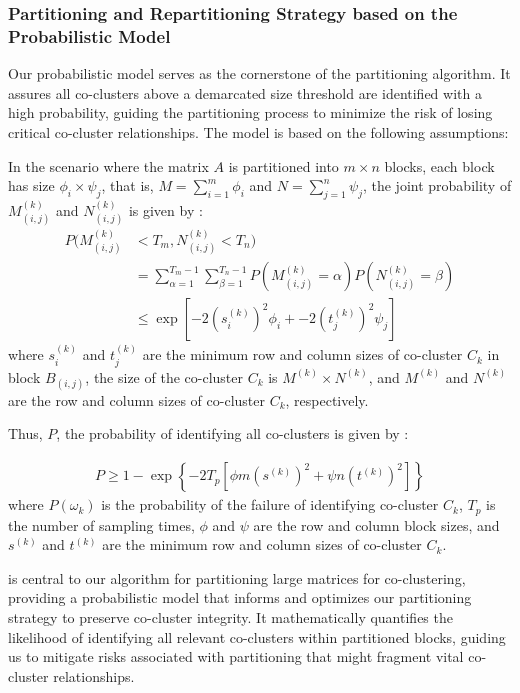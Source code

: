 \documentclass[journal]{IEEEtran}
\begin{document}
\subsubsection{Partitioning and Repartitioning Strategy based on the Probabilistic Model}

Our probabilistic model serves as the cornerstone of the partitioning algorithm. It assures all co-clusters above a demarcated size threshold are identified with a high probability, guiding the partitioning process to minimize the risk of losing critical co-cluster relationships. The model is based on the following assumptions:

In the scenario where the matrix $A$ is partitioned into $m \times n$ blocks, each block has size $\phi_i \times \psi_j$, that is, $M=\sum_{i=1}^m \phi_i$ and $N=\sum_{j=1}^n \psi_j$, the joint probability of $M_{(i,j)}^{(k)}$ and $N_{(i,j)}^{(k)}$ is given by :
\begin{align*}
  P(M_{(i,j)}^{(k)} & < T_m, N_{(i,j)}^{(k)} < T_n)                                                                           \\
                    & = \sum_{\alpha=1}^{T_m-1} \sum_{\beta=1}^{T_n-1} P(M_{(i,j)}^{(k)} = \alpha) P(N_{(i,j)}^{(k)} = \beta) \\
                    & \le \exp[-2 (s_i^{(k)})^2 \phi_i + -2 (t_j^{(k)})^2 \psi_j]
\end{align*}
where $s_i^{(k)}$ and $t_j^{(k)}$ are the minimum row and column sizes of co-cluster $C_k$ in block $B_{(i,j)}$, the size of the co-cluster $C_k$ is $M^{(k)} \times N^{(k)}$, and $M^{(k)}$ and $N^{(k)}$ are the row and column sizes of co-cluster $C_k$, respectively. 

Thus, $P$, the probability of identifying all co-clusters is given by :

\begin{align}
  P \ge 1 - \exp \left\{ -2 T_p [\phi m (s^{(k)})^2 + \psi n (t^{(k)})^2] \right\} \label{eq:prob_of_identifying_all_co_clusters}
\end{align}
where $P(\omega_k)$ is the probability of the failure of identifying co-cluster $C_k$, $T_p$ is the number of sampling times, $\phi$ and $\psi$ are the row and column block sizes, and $s^{(k)}$ and $t^{(k)}$ are the minimum row and column sizes of co-cluster $C_k$.

 is central to our algorithm for partitioning large matrices for co-clustering, providing a probabilistic model that informs and optimizes our partitioning strategy to preserve co-cluster integrity. It mathematically quantifies the likelihood of identifying all relevant co-clusters within partitioned blocks, guiding us to mitigate risks associated with partitioning that might fragment vital co-cluster relationships.
\end{document}
